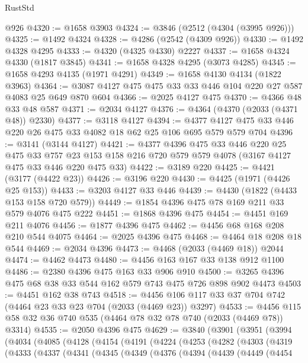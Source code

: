 \begin{lexlean}{RustStd}
\begin{coremodule}
    @926
@4320 := @1658 @3903
@4324 := @3846 (@2512 (@4304 (@3995 @926)))
@4325 := @1492 @4324
@4328 := @4286 (@2542 (@4309 @926))
@4330 := @1492 @4328 @4295
@4333 := @4320 (@4325 @4330) @2227
@4337 := @1658 @4324 @4330 (@1817 @3845)
@4341 := @1658 @4328 @4295 (@3073 @4285)
@4345 := @1658 @4293 @4135 (@1971 @4291)
@4349 := @1658 @4130 @4134 (@1822 @3963)
@4364 := @3087 @4127 @475 @475 @33 @33 @446 @104 @220 @27 @587 @4083 @25 @649 @870 @604
@4366 := @2025 @4127 @475
@4370 := @4366 @48 @33 @48 @587
@4371 := @2034 @4127
@4376 := @4364 (@4370 (@2033 (@4371 @48)) @2330)
@4377 := @3118 @4127
@4394 := @4377 @4127 @475 @33 @446 @220 @26 @475 @33 @4082 @18 @62 @25 @106 @695 @579 @579 @704
@4396 := @3141 (@3144 @4127)
@4421 := @4377
    @4396
    @475
    @33
    @446
    @220
    @25
    @475
    @33
    @757
    @23
    @153
    @158
    @216
    @720
    @579
    @579
    @4078
    (@3167 @4127 @475 @33 @446 @220 @475 @33)
@4422 := @3189 @220
@4425 := @4421 (@3177 (@4422 @23))
@4426 := @3196 @220
@4430 := @4425 (@1971 (@4426 @25 @153))
@4433 := @3203 @4127 @33 @446
@4439 := @4430 (@1822 (@4433 @153 @158 @720 @579))
@4449 := @1854 @4396 @475 @78 @169 @211 @33 @579 @4076 @475 @222
@4451 := @1868 @4396 @475
@4454 := @4451 @169 @211 @4076
@4456 := @1877 @4396 @475
@4462 := @4456 @68 @168 @208 @210 @544 @4075
@4464 := @2025 @4396 @475
@4468 := @4464 @18 @208 @18 @544
@4469 := @2034 @4396
@4473 := @4468 (@2033 (@4469 @18)) @2044
@4474 := @4462 @4473
@4480 := @4456 @163 @167 @33 @138 @912 @1100
@4486 := @2380 @4396 @475 @163 @33 @906 @910
@4500 := @3265 @4396 @475 @68 @38 @33 @544 @162 @579 @743 @475 @726 @898 @902 @4473
@4503 := @4451 @162 @38 @743
@4518 := @4456 @106 @117 @33 @37 @704 @742 (@4464 @23 @33 @23 @704 (@2033 (@4469 @23)) @3297)
@4533 := @4456 @115 @58 @32 @36 @740 @535 (@4464 @78 @32 @78 @740 (@2033 (@4469 @78)) @3314)
@4535 := @2050 @4396 @475
@4629 := @3840
    (@3901
      (@3951
        (@3994
          (@4034
            (@4085
              (@4128
                (@4154
                  (@4191
                    (@4224
                      (@4253
                        (@4282
                          (@4303
                            (@4319
                              (@4333
                                (@4337
                                  (@4341
                                    (@4345
                                      (@4349
                                        (@4376
                                          (@4394
                                            (@4439
                                              (@4449
                                                (@4454

\end{coremodule}
\end{lexlean}
